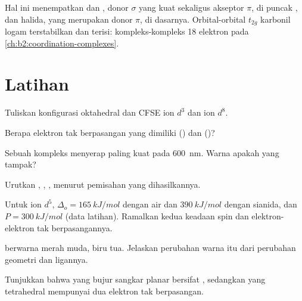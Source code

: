 Hal ini menempatkan  dan , donor $\sigma$ yang kuat sekaligus
akseptor $\pi$, di puncak , dan halida, yang merupakan
donor $\pi$, di dasarnya. Orbital-orbital $t_{2g}$ karbonil logam
terstabilkan dan terisi: kompleks-kompleks 18 elektron pada
\cref{ch:b2:coordination-complexes}.

\section{Latihan}

\begin{exercise}[$\star$]\label{exo:b2:ligand-field:1}
Tuliskan konfigurasi oktahedral dan CFSE ion $d^3$ dan ion $d^8$.
\end{exercise}

\begin{exercise}[$\star$]\label{exo:b2:ligand-field:2}
Berapa elektron tak berpasangan yang dimiliki  () dan  ()?
\end{exercise}

\begin{exercise}[$\star$]\label{exo:b2:ligand-field:3}
Sebuah kompleks menyerap paling kuat pada \qty{600}{nm}. Warna apakah yang tampak?
\end{exercise}

\begin{exercise}[$\star$]\label{exo:b2:ligand-field:4}
Urutkan , , ,  menurut pemisahan yang dihasilkannya.
\end{exercise}

\begin{exercise}[$\star\star$]\label{exo:b2:ligand-field:5}
Untuk ion $d^5$, $\Delta_o = \qty{165}{kJ/mol}$ dengan air dan $\qty{390}{kJ/mol}$
dengan sianida, dan $P = \qty{300}{kJ/mol}$ (data latihan). Ramalkan kedua
keadaan spin dan elektron-elektron tak berpasangannya.
\end{exercise}

\begin{exercise}[$\star\star$]\label{exo:b2:ligand-field:6}
 berwarna merah muda,  biru tua. Jelaskan
perubahan warna itu dari perubahan geometri dan ligannya.
\end{exercise}

\begin{exercise}[$\star\star$]\label{exo:b2:ligand-field:7}
Tunjukkan bahwa  yang bujur sangkar planar bersifat
, sedangkan  yang tetrahedral mempunyai dua
elektron tak berpasangan.
\end{exercise}

